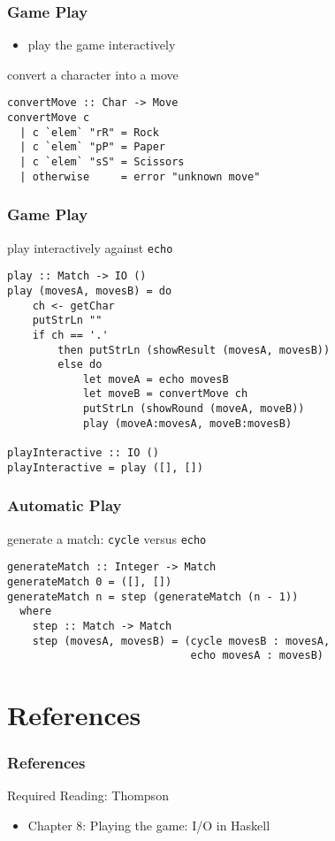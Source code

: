 \documentclass[dvipsnames]{beamer}
\theoremstyle{plain}
\begin{document}
\begin{frame}[fragile]
  \frametitle{Game Play}

  \begin{itemize}
    \item play the game interactively
  \end{itemize}

  \begin{exampleblock}{convert a character into a move}
    \begin{lstlisting}
convertMove :: Char -> Move
convertMove c
  | c `elem` "rR" = Rock
  | c `elem` "pP" = Paper
  | c `elem` "sS" = Scissors
  | otherwise     = error "unknown move"
    \end{lstlisting}
  \end{exampleblock}
\end{frame}

\begin{frame}[fragile]
  \frametitle{Game Play}

  \begin{exampleblock}{play interactively against \lstinline|echo|}
    \begin{lstlisting}
play :: Match -> IO ()
play (movesA, movesB) = do
    ch <- getChar
    putStrLn ""
    if ch == '.'
        then putStrLn (showResult (movesA, movesB))
        else do
            let moveA = echo movesB
            let moveB = convertMove ch
            putStrLn (showRound (moveA, moveB))
            play (moveA:movesA, moveB:movesB)

playInteractive :: IO ()
playInteractive = play ([], [])
    \end{lstlisting}
  \end{exampleblock}
\end{frame}

\begin{frame}[fragile]
  \frametitle{Automatic Play}

  \begin{exampleblock}{generate a match:
      \lstinline[deletekeywords={cycle}]|cycle| versus \lstinline|echo|}
    \begin{lstlisting}[deletekeywords={cycle}]
generateMatch :: Integer -> Match
generateMatch 0 = ([], [])
generateMatch n = step (generateMatch (n - 1))
  where
    step :: Match -> Match
    step (movesA, movesB) = (cycle movesB : movesA,
                             echo movesA : movesB)
    \end{lstlisting}
  \end{exampleblock}
\end{frame}

\section*{References}

\begin{frame}
  \frametitle{References}

  \begin{block}{Required Reading: Thompson}
    \begin{itemize}
      \item Chapter 8: \alert{Playing the game: I/O in Haskell}
    \end{itemize}
  \end{block}
\end{frame}
\end{document}
